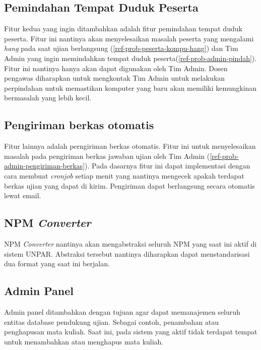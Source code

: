     \subsection{Pemindahan Tempat Duduk Peserta}
        Fitur kedua yang ingin ditambahkan adalah fitur pemindahan tempat duduk
        peserta. Fitur ini nantinya akan
        menyelesaikan masalah peserta yang mengalami \textit{hang} pada saat
        ujian berlangsung (\ref{ref-prob-peserta-kompu-hang}) dan Tim Admin yang
        ingin memindahkan tempat duduk peserta(\ref{ref-prob-admin-pindah}). Fitur ini nantinya hanya
        akan dapat digunakan oleh Tim Admin. Dosen pengawas diharapkan untuk
        mengkontak Tim Admin untuk melakukan perpindahan untuk memastikan
        komputer yang baru akan memiliki kemungkinan bermasalah yang lebih
        kecil.

    \subsection{Pengiriman berkas otomatis}
        Fitur lainnya adalah perngiriman berkas otomatis. Fitur ini untuk
        menyelesaikan masalah pada pengiriman berkas jawaban ujian oleh Tim
        Admin (\ref{ref-prob-admin-pengiriman-berkas}). Pada dasarnya fitur ini
        dapat implementasi dengan cara membuat \textit{cronjob} setiap menit
        yang nantinya mengecek apakah terdapat berkas ujian yang dapat di kirim.
        Pengiriman dapat berlangsung secara otomatis lewat email.

    \subsection{NPM \textit{Converter}} NPM \textit{Converter} nantinya akan
        mengabstraksi seluruh NPM yang saat ini aktif di sistem UNPAR. Abstraksi
        tersebut nantinya diharapkan dapat menstandarisasi dua format yang saat
        ini berjalan.
        
    \subsection{Admin Panel}
        Admin panel ditambahkan dengan tujuan agar dapat memanajemen seluruh
        entitas database pendukung ujian. Sebagai contoh, penambahan atau
        penghapusan mata kuliah. Saat ini, pada sistem yang aktif tidak terdapat
        tempat untuk menambahkan atau menghapus mata kuliah.
    
